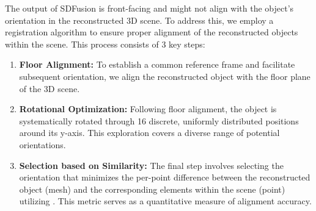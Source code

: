 The output of SDFusion is front-facing and might not align with the object's orientation in the reconstructed 3D scene. To address this, we employ a registration algorithm to ensure proper alignment of the reconstructed objects within the scene. This process consists of 3 key steps:
\begin{enumerate}
    \item \textbf{Floor Alignment:} To establish a common reference frame and facilitate subsequent orientation, we align the reconstructed object with the floor plane of the 3D scene.
    
    \item \textbf{Rotational Optimization:} Following floor alignment, the object is systematically rotated through 16 discrete, uniformly distributed positions around its y-axis. This exploration covers a diverse range of potential orientations.
    
    \item \textbf{Selection based on Similarity:} The final step involves selecting the orientation that minimizes the per-point difference between the reconstructed object (mesh) and the corresponding elements within the scene (point) utilizing \cite{trimesh}. This metric serves as a quantitative measure of alignment accuracy.
\end{enumerate}
